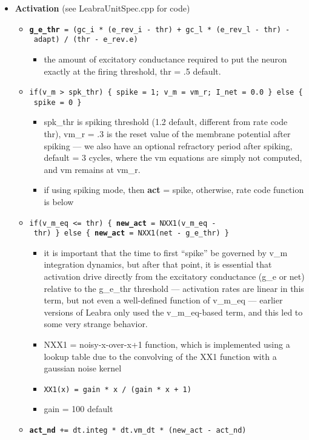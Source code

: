 \begin{itemize}
\tightlist
\item
  \textbf{Activation} (see LeabraUnitSpec.cpp for code)

  \begin{itemize}
  \tightlist
  \item
    \textbf{\texttt{g\_e\_thr}}\texttt{\ =\ (gc\_i\ *\ (e\_rev\_i\ -\ thr)\ +\ gc\_l\ *\ (e\_rev\_l\ -\ thr)\ -\ adapt)\ /\ (thr\ -\ e\_rev.e)}

    \begin{itemize}
    \tightlist
    \item
      the amount of excitatory conductance required to put the neuron
      exactly at the firing threshold, thr = .5 default.
    \end{itemize}
  \item
    \texttt{if(v\_m\ \textgreater{}\ spk\_thr)\ \{\ spike\ =\ 1;\ v\_m\ =\ vm\_r;\ I\_net\ =\ 0.0\ \}\ else\ \{\ spike\ =\ 0\ \}}

    \begin{itemize}
    \tightlist
    \item
      spk\_thr is spiking threshold (1.2 default, different from rate
      code thr), vm\_r = .3 is the reset value of the membrane potential
      after spiking --- we also have an optional refractory period
      after spiking, default = 3 cycles, where the vm equations are
      simply not computed, and vm remains at vm\_r.
    \item
      if using spiking mode, then \textbf{act} = spike, otherwise, rate
      code function is below
    \end{itemize}
  \item
    \texttt{if(v\_m\_eq\ \textless{}=\ thr)\ \{\ }\textbf{\texttt{new\_act}}\texttt{\ =\ NXX1(v\_m\_eq\ -\ thr)\ \}\ else\ \{\ }\textbf{\texttt{new\_act}}\texttt{\ =\ NXX1(net\ -\ g\_e\_thr)\ \}}

    \begin{itemize}
    \tightlist
    \item
      it is important that the time to first ``spike'' be governed by
      v\_m integration dynamics, but after that point, it is essential
      that activation drive directly from the excitatory conductance
      (g\_e or net) relative to the g\_e\_thr threshold --- activation
      rates are linear in this term, but not even a well-defined
      function of v\_m\_eq --- earlier versions of Leabra only used the
      v\_m\_eq-based term, and this led to some very strange behavior.
    \item
      NXX1 = noisy-x-over-x+1 function, which is implemented using a
      lookup table due to the convolving of the XX1 function with a
      gaussian noise kernel
    \item
      \texttt{XX1(x)\ =\ gain\ *\ x\ /\ (gain\ *\ x\ +\ 1)}
    \item
      gain = 100 default
    \end{itemize}
  \item
    \textbf{\texttt{act\_nd}}\texttt{\ +=\ dt.integ\ *\ dt.vm\_dt\ *\ (new\_act\ -\ act\_nd)}


\end{itemize}
\end{itemize}
